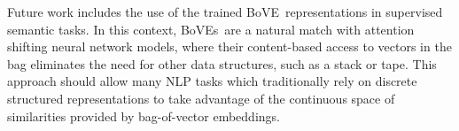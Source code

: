 \documentclass[11pt,a4paper]{article}
\newcommand{\bove}{Bo{\nolinebreak\hspace{-0.25ex}}VE}
\newcommand{\boves}{Bo{\nolinebreak\hspace{-0.25ex}}VEs}
\begin{document}
Future work includes the use of the trained \bove\ representations in
supervised semantic tasks.  In this context, \boves\ are a natural match with
attention shifting neural network models, where their content-based access to
vectors in the bag eliminates the need for other data structures, such as a
stack or tape.  This approach should allow many NLP tasks which traditionally
rely on discrete structured representations to take advantage of the
continuous space of similarities provided by bag-of-vector embeddings.




\end{document}

